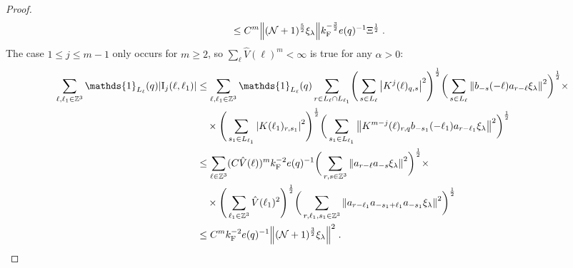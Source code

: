 \documentclass[12pt,a4paper]{article}
\numberwithin{equation}{section}
\newcommand{\1}{\mathbb{I}}
\newcommand{\F}{\mathrm{F}}
\newcommand{\I}{\mathrm{I}}
\newcommand{\kF}{k_\F}
\newcommand{\Zstar}{\mathbb{Z}^3} %
\newcommand{\Z}{\mathbb{Z}}
\newcommand{\NN}{\mathcal{N}}
\newcommand{\half}{\frac{1}{2}}
\theoremstyle{plain}
\theoremstyle{definition}
\theoremstyle{remark}
\theoremstyle{plain}
\theoremstyle{definition}
\theoremstyle{remark}
\begin{document}
\begin{proof}
\begin{align}
 	&\leq C^m \norm{ (\NN+1)^{\frac 52}\xi_\lambda}
 		\kF^{-\frac 32} e(q)^{-1} \Xi^{\half} \;. \label{eq:estEQ2111}
\end{align}
The case $ 1 \le j \le m-1 $ only occurs for $ m \ge 2 $, so $ \sum_\ell \hat{V}(\ell)^m < \infty $ is true for any $ \alpha > 0 $:
\begin{align}
	\sum_{\ell,\ell_1 \in \Zstar} \mathds{1}_{L_\ell}(q) |\I_j(\ell, \ell_1)|
	&\leq \sum_{\ell,\ell_1 \in \Zstar} \mathds{1}_{L_\ell}(q) \sum\limits_{r\in L_{\ell} \cap L_{\ell_1}}\! \Bigg( \sum\limits_{s \in L_\ell} \abs{K^{j}(\ell)_{q,s}}^2\Bigg)^\half \bigg( \sum\limits_{s \in L_\ell}\norm{b_{-s}(-\ell) a_{r-\ell} \xi_\lambda}^2\bigg)^\half \times\nonumber\\
		&\quad \times \Bigg( \sum\limits_{s_1 \in L_{\ell_1}}\abs{K(\ell_1)_{r,s_1}}^2\Bigg)^\half \bigg(\sum\limits_{s_1 \in L_{\ell_1}}\norm{ K^{m-j}(\ell)_{r,q} b_{-s_1}(-\ell_1)  a_{r-\ell_1} \xi_\lambda }^2\bigg)^\half
	\nonumber\\
	&\leq \sum_{\ell \in \Zstar} (C \hat{V}(\ell))^m
		\kF^{-2} e(q)^{-1}
		\bigg( \sum\limits_{r, s\in \Z^3} \norm{ a_{r-\ell} a_{-s} \xi_\lambda}^2\bigg)^\half \times \nonumber\\
		&\quad \times 
		\Bigg( \sum_{\ell_1 \in \Zstar} \hat{V}(\ell_1)^2 \Bigg)^{\half}
	\bigg(
		\sum\limits_{r, \ell_1, s_1 \in \Z^3} \norm{ a_{r-\ell_1} a_{-s_1 + \ell_1} a_{-s_1} \xi_\lambda }^2\bigg)^\half
	\nonumber\\
	&\leq C^m \kF^{-2} e(q)^{-1}
	\norm{ (\NN+1)^{\frac 32} \xi_\lambda}^2 \;. \label{eq:estEQ2112_Coulomb}
\end{align}


\end{proof}
\end{document}
